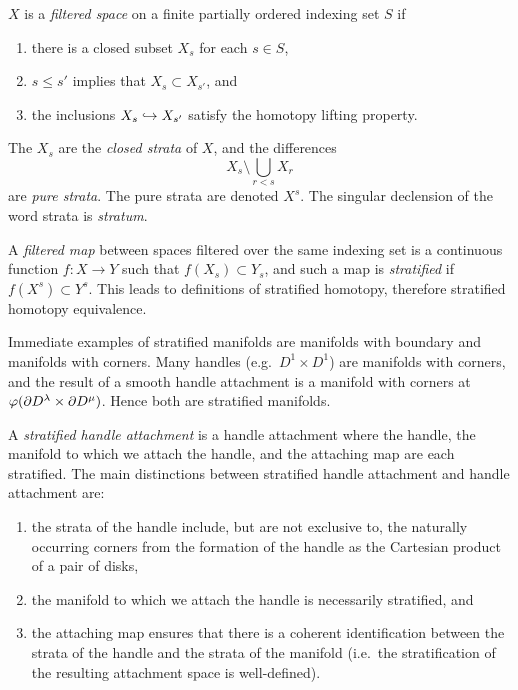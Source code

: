 \begin{defn}[Stratification]
	$X$ is a \emph{filtered space} on a finite partially ordered indexing set $S$ if 
	\begin{enumerate}
		\item there is a closed subset $X_s$ for each $s\in S$,
		\item $s\leq s'$ implies that $X_s\subset X_{s'}$, and
		\item the inclusions $X_s \hookrightarrow X_{s'}$ satisfy the homotopy lifting property.
	\end{enumerate}
	The $X_s$ are the \emph{closed strata} of $X$, and the differences
	$$X_s\setminus \bigcup_{r < s} X_r$$
	are \emph{pure strata}.
	The pure strata are denoted $X^s$.
	The singular declension of the word strata is \emph{stratum}.
	
	A \emph{filtered map} between spaces filtered over the same indexing set is a continuous function $f:X\to Y$ such that $f(X_s)\subset Y_s$, and such a map is \emph{stratified} if $f(X^s) \subset Y^s$.
	This leads to definitions of stratified homotopy, therefore stratified homotopy equivalence.
\end{defn}

Immediate examples of stratified manifolds are manifolds with boundary and manifolds with corners.
Many handles (e.g.\ $D^1\times D^1$) are manifolds with corners, and the result of a smooth handle attachment is a manifold with corners at $\varphi(\partial D^\lambda \times \partial D^\mu)$.
Hence both are stratified manifolds.

A \emph{stratified handle attachment} is a handle attachment where the handle, the manifold to which we attach the handle, and the attaching map are each stratified.
The main distinctions between stratified handle attachment and handle attachment are:
\begin{enumerate}
	\item the strata of the handle include, but are not exclusive to, the naturally occurring corners from the formation of the handle as the Cartesian product of a pair of disks,
	
	\item the manifold to which we attach the handle is necessarily stratified, and
	
	\item the attaching map ensures that there is a coherent identification between the strata of the handle and the strata of the manifold (i.e.\ the stratification of the resulting attachment space is well-defined).
\end{enumerate}



